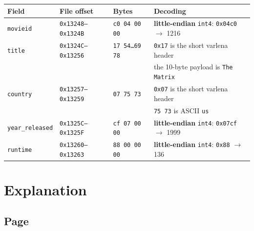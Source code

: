 \documentclass[10pt,a4paper]{article}
\begin{document}
\begin{itemize}
          \begin{table}[h]
              \centering
              \small
              \begin{tabular}{@{}llll@{}}
                  \toprule
                  Field                   & File offset               & Bytes                     & Decoding                                                                 \\
                  \midrule
                  \texttt{movieid}        & \texttt{0x13248--0x1324B} & \texttt{c0 04 00 00}      & \textbf{little-endian} \texttt{int4}: \texttt{0x04c0} $\rightarrow$ 1216 \\
                  \texttt{title}          & \texttt{0x1324C--0x13256} & \texttt{17 54\dots 69 78} & \texttt{0x17} is the short varlena header                                \\
                                          &                           &                           & the 10-byte payload is \texttt{The Matrix}                               \\
                  \texttt{country}        & \texttt{0x13257--0x13259} & \texttt{07 75 73}         & \texttt{0x07} is the short varlena header                                \\
                                          &                           &                           & \texttt{75 73} is ASCII \texttt{us}                                      \\
                  \texttt{year\_released} & \texttt{0x1325C--0x1325F} & \texttt{cf 07 00 00}      & \textbf{little-endian} \texttt{int4}: \texttt{0x07cf} $\rightarrow$ 1999 \\
                  \texttt{runtime}        & \texttt{0x13260--0x13263} & \texttt{88 00 00 00}      & \textbf{little-endian} \texttt{int4}: \texttt{0x88} $\rightarrow$ 136    \\
                  \bottomrule
              \end{tabular}
          \end{table}
\end{itemize}

\section{Explanation}

\subsection{Page}
\end{document}
